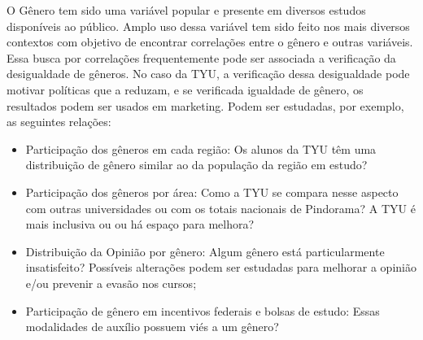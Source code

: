 \documentclass[10pt,a4paper,oneside]{article}
\begin{document}
O Gênero tem sido uma variável popular e presente em diversos estudos disponíveis ao público. 
Amplo uso dessa variável tem sido feito nos mais diversos contextos com objetivo de encontrar correlações entre o gênero e outras variáveis. Essa busca por correlações frequentemente pode ser associada a verificação da desigualdade de gêneros. No caso da TYU, a verificação dessa desigualdade pode motivar políticas que a reduzam, e se verificada igualdade de gênero, os resultados podem ser usados em marketing. Podem ser estudadas, por exemplo, as seguintes relações:
\begin{itemize}
	\item Participação dos gêneros em cada região: Os alunos da TYU têm uma distribuição de gênero similar ao da população da região em estudo?
	\item Participação dos gêneros por área: Como a TYU se compara nesse aspecto com outras universidades ou com os totais nacionais de Pindorama? A TYU é mais inclusiva ou ou há espaço para melhora?
	\item Distribuição da Opinião por gênero: Algum gênero está particularmente insatisfeito? Possíveis alterações podem ser estudadas para melhorar a opinião e/ou prevenir a evasão nos cursos;
	\item Participação de gênero em incentivos federais e bolsas de estudo: Essas modalidades de auxílio possuem viés a um gênero?
\end{itemize}
\end{document}
